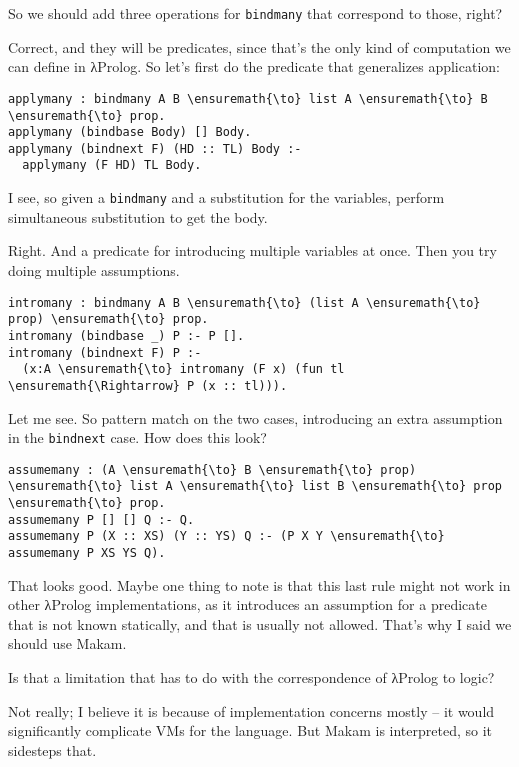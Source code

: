 \heroSTUDENT{} So we should add three operations for \texttt{bindmany} that
correspond to those, right?

\heroADVISOR{} Correct, and they will be predicates, since that's the only
kind of computation we can define in \foreignlanguage{greek}{λ}Prolog. So let's first do the
predicate that generalizes application:

\begin{verbatim}
applymany : bindmany A B \ensuremath{\to} list A \ensuremath{\to} B \ensuremath{\to} prop.
applymany (bindbase Body) [] Body.
applymany (bindnext F) (HD :: TL) Body :-
  applymany (F HD) TL Body.
\end{verbatim}

\heroSTUDENT{} I see, so given a \texttt{bindmany} and a substitution for the
variables, perform simultaneous substitution to get the body.

\heroADVISOR{} Right. And a predicate for introducing multiple variables at
once. Then you try doing multiple assumptions.

\begin{verbatim}
intromany : bindmany A B \ensuremath{\to} (list A \ensuremath{\to} prop) \ensuremath{\to} prop.
intromany (bindbase _) P :- P [].
intromany (bindnext F) P :-
  (x:A \ensuremath{\to} intromany (F x) (fun tl \ensuremath{\Rightarrow} P (x :: tl))).
\end{verbatim}

\heroSTUDENT{} Let me see. So pattern match on the two cases, introducing an
extra assumption in the \texttt{bindnext} case. How does this look?

\begin{verbatim}
assumemany : (A \ensuremath{\to} B \ensuremath{\to} prop) \ensuremath{\to} list A \ensuremath{\to} list B \ensuremath{\to} prop \ensuremath{\to} prop.
assumemany P [] [] Q :- Q.
assumemany P (X :: XS) (Y :: YS) Q :- (P X Y \ensuremath{\to} assumemany P XS YS Q).
\end{verbatim}

\heroADVISOR{} That looks good. Maybe one thing to note is that this last rule
might not work in other \foreignlanguage{greek}{λ}Prolog implementations, as it introduces an
assumption for a predicate that is not known statically, and that is
usually not allowed. That's why I said we should use Makam.

\heroSTUDENT{} Is that a limitation that has to do with the correspondence of
\foreignlanguage{greek}{λ}Prolog to logic?

\heroADVISOR{} Not really; I believe it is because of implementation concerns
mostly -- it would significantly complicate VMs for the language. But
Makam is interpreted, so it sidesteps that.

